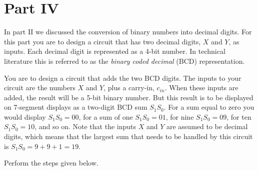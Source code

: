 \documentclass[epsfig,10pt,fullpage]{article}
\begin{document}
\section*{Part IV}
In part II we discussed the conversion of binary numbers into decimal digits. For this
part you are to design a circuit that has two decimal digits, $X$ and $Y$, as inputs.
Each decimal digit is represented as a 4-bit number. In technical literature this is 
referred to as the {\it binary coded decimal} (BCD) representation. 

You are to design a circuit that adds the two BCD digits. The inputs to your circuit
are the numbers $X$ and $Y$, plus a carry-in, $c_{in}$. When these inputs are
added, the result will be a 5-bit binary number. But this result is to be displayed
on 7-segment displays as a two-digit BCD sum $S_1 S_0$. For a sum equal to zero you
would display $S_1 S_0 = 00$, for a sum of one $S_1 S_0 = 01$, for nine 
$S_1 S_0 = 09$, for ten $S_1 S_0 = 10$, and so on. Note that the inputs 
$X$ and $Y$ are assumed to be decimal
digits, which means that the largest sum that needs to be handled by this 
circuit is $S_1 S_0 = 9 + 9 + 1 = 19$. 

Perform the steps given below.
\end{document}
